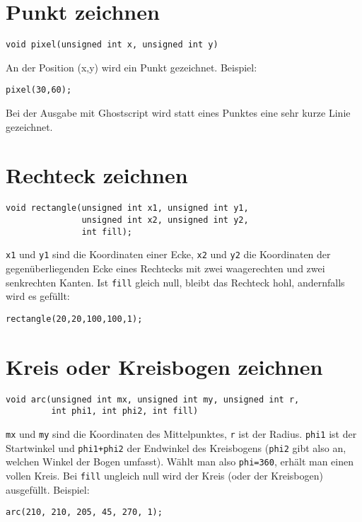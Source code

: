 \documentclass{article}
\begin{document}
\section{Punkt zeichnen}
\begin{verbatim}
void pixel(unsigned int x, unsigned int y)
\end{verbatim}
An der Position (x,y) wird ein Punkt gezeichnet.
Beispiel:
\begin{verbatim}
pixel(30,60);
\end{verbatim}
Bei der Ausgabe mit Ghostscript wird statt eines
Punktes eine sehr kurze Linie gezeichnet.
\section{Rechteck zeichnen}
\begin{verbatim}
void rectangle(unsigned int x1, unsigned int y1,
               unsigned int x2, unsigned int y2, 
               int fill);
\end{verbatim}
\verb_x1_ und \verb_y1_ sind die Koordinaten einer Ecke, 
\verb_x2_ und \verb_y2_ die Koordinaten der gegen\"uberliegenden Ecke
eines Rechtecks mit zwei waagerechten und zwei senkrechten
Kanten. Ist \verb_fill_ gleich null, bleibt das Rechteck hohl,
andernfalls wird es gef\"ullt:
\begin{verbatim}
rectangle(20,20,100,100,1);
\end{verbatim}
\section{Kreis oder Kreisbogen zeichnen}
\begin{verbatim}
void arc(unsigned int mx, unsigned int my, unsigned int r,
         int phi1, int phi2, int fill)
\end{verbatim}
\verb_mx_ und \verb_my_ sind die Koordinaten des Mittelpunktes, \verb_r_ ist der
Radius. \verb_phi1_ ist der Startwinkel und \verb_phi1+phi2_ der Endwinkel
des Kreisbogens (\verb_phi2_ gibt also an, welchen Winkel der Bogen
umfasst).
W\"ahlt man also \verb_phi=360_, erh\"alt man einen vollen Kreis.
Bei \verb_fill_ ungleich null wird der Kreis (oder der Kreisbogen)
ausgef\"ullt. Beispiel:
\begin{verbatim}
arc(210, 210, 205, 45, 270, 1);
\end{verbatim}
\end{document}
